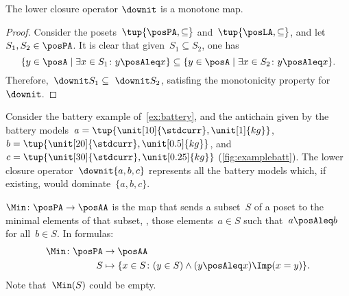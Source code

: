 \begin{lemma}
  The lower closure operator $\downit$ is a monotone map.
\end{lemma}

\begin{proof}
  Consider the posets~$\tup{\posPA,\subseteq}$ and~$\tup{\posLA,\subseteq}$, and let~$S_1,S_2\in \posPA$. It is clear that given~$S_1\subseteq S_2$, one has
  \begin{equation}
    \{y\in \posA\mid \exists x\in S_1\colon y\posAleq x\} \subseteq \{y\in \posA\mid \exists x\in S_2\colon y\posAleq x\}.
  \end{equation}
  Therefore,~$\downit S_1\subseteq \ \downit S_2$, satisfing the monotonicity property for~$\downit$.
\end{proof}



\begin{example}
  Consider the battery example of~\cref{ex:battery}, and the antichain given by the battery models~$a=\tup{\unit[10]{\stdcurr},\unit[1]{kg}}$,~$b=\tup{\unit[20]{\stdcurr},\unit[0.5]{kg}}$, and~$c=\tup{\unit[30]{\stdcurr},\unit[0.25]{kg}}$ (\cref{fig:examplebatt}).
  The lower closure operator~$\downit\{a,b,c\}$ represents all the battery models which, if existing, would dominate~$\{a,b,c\}$.

\end{example}
\begin{figure*}[h!]
  \begin{center}
  \end{center}
  \caption{Battery example. From the left: antichain, upper closure, and lower closure.
  }
  \label{fig:examplebatt}
\end{figure*}


\begin{definition}[Min]
  \label{def:Min}
  $\Min \colon \posPA \to \posAA$ is the map that sends a subset~$S$ of a poset to the minimal elements of that subset, \ie , those elements~$a \in S$ such that~$a \posAleq b$ for all~$b \in S$.
  In formulas:
  \begin{equation*}
    \begin{aligned}
      \Min \colon \posPA &\to \posAA\\
      S&\mapsto \{ x\in S\colon (y\in S)\wedge(y\posAleq x)\Imp (x=y)\}.
    \end{aligned}
  \end{equation*}
  Note that~$\Min(S)$ could be empty.
\end{definition}

